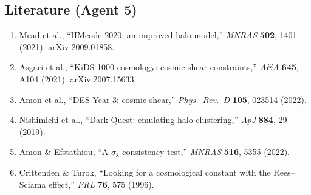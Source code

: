 \documentclass[11pt,a4paper]{article}
\begin{document}
\subsection{Literature (Agent 5)}

\begin{enumerate}
\item Mead et al., ``HMcode-2020: an improved halo model,'' \textit{MNRAS} \textbf{502}, 1401 (2021). arXiv:2009.01858.
\item Asgari et al., ``KiDS-1000 cosmology: cosmic shear constraints,'' \textit{A\&A} \textbf{645}, A104 (2021). arXiv:2007.15633.
\item Amon et al., ``DES Year 3: cosmic shear,'' \textit{Phys.\ Rev.\ D} \textbf{105}, 023514 (2022).
\item Nishimichi et al., ``Dark Quest: emulating halo clustering,'' \textit{ApJ} \textbf{884}, 29 (2019).
\item Amon \& Efstathiou, ``A $\sigma_8$ consistency test,'' \textit{MNRAS} \textbf{516}, 5355 (2022).
\item Crittenden \& Turok, ``Looking for a cosmological constant with the Rees--Sciama effect,'' \textit{PRL} \textbf{76}, 575 (1996).
\end{enumerate}
\end{document}
